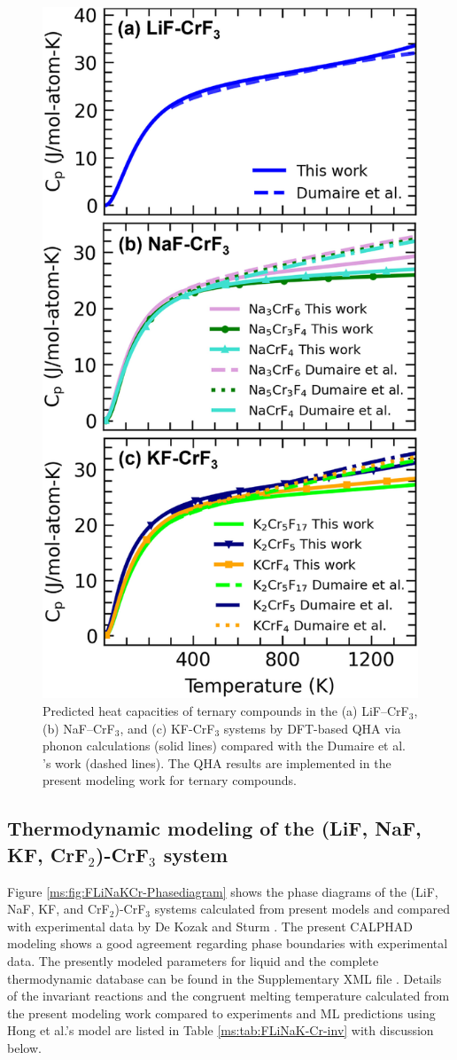 \begin{figure}[H]
    \centering
    \includegraphics[width=0.5\linewidth]{moltensalts/Moltensalts-FLiNaKCr-DFTcompounds.jpg}
    \caption{Predicted heat capacities of ternary compounds in the (a) LiF–CrF$_3$, (b) NaF–CrF$_3$, and (c) KF-CrF$_3$ systems by DFT-based QHA via phonon calculations (solid lines) compared with the Dumaire et al. \cite{dumaire2021thermodynamic}'s work (dashed lines). The QHA results are implemented in the present modeling work for ternary compounds.}
    \label{ms:fig:FLiNaKCr-DFTcompounds}
\end{figure}



\subsection{Thermodynamic modeling of the (LiF, NaF, KF, CrF$_2$)-CrF$_3$ system} \label{moltensalts:ssec:FLiNaKCrmodeling}

Figure \ref{ms:fig:FLiNaKCr-Phasediagram} shows the phase diagrams of the (LiF, NaF, KF, and CrF$_2$)-CrF$_3$ systems calculated from present models and compared with experimental data by De Kozak \cite{de1975systeme, DeKozak1969} and Sturm \cite{sturm1962phase}. The present CALPHAD modeling shows a good agreement regarding phase boundaries with experimental data. The presently modeled parameters for liquid and the complete thermodynamic database can be found in the Supplementary XML file \cite{gong2024revisiting}. Details of the invariant reactions and the congruent melting temperature calculated from the present modeling work compared to experiments \cite{de1975systeme, DeKozak1969, sturm1962phase} and ML predictions using Hong et al.’s model \cite{hong2022melting} are listed in Table \ref{ms:tab:FLiNaK-Cr-inv} with discussion below. 

